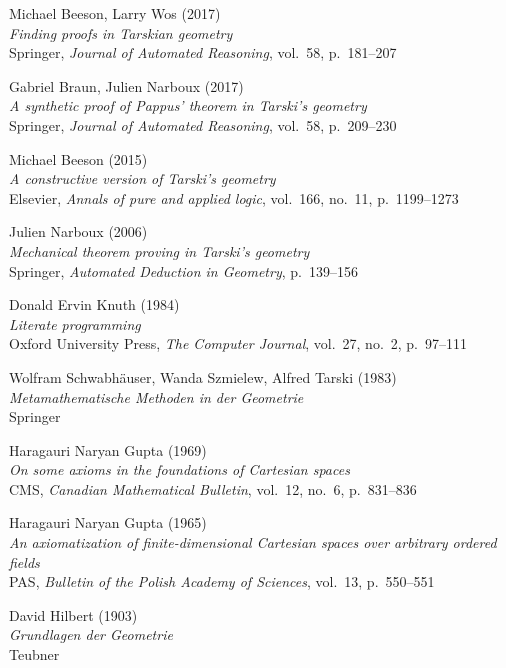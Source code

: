 \documentclass[10pt,a4paper,parskip=half,numbers=endperiod,parskip]{scrartcl}
\theoremstyle{formalized}
\begin{document}
  Michael Beeson, Larry Wos (2017)
  \\ \textit{Finding proofs in Tarskian geometry}
  \\ Springer, \textit{Journal of Automated Reasoning}, vol.~58, p.~181--207

  Gabriel Braun, Julien Narboux (2017)
  \\ \textit{A synthetic proof of Pappus' theorem in Tarski's geometry}
  \\ Springer, \textit{Journal of Automated Reasoning}, vol.~58, p.~209--230

  Michael Beeson (2015)
  \\ \textit{A constructive version of Tarski's geometry}
  \\ Elsevier, \textit{Annals of pure and applied logic}, vol.~166, no.~11, p.~1199--1273

  Julien Narboux (2006)
  \\ \textit{Mechanical theorem proving in Tarski's geometry}
  \\ Springer, \textit{Automated Deduction in Geometry}, p.~139--156

  Donald Ervin Knuth (1984)
  \\ \textit{Literate programming}
  \\ Oxford University Press, \textit{The Computer Journal}, vol.~27, no.~2, p.~97--111

  Wolfram Schwabhäuser, Wanda Szmielew, Alfred Tarski (1983)
  \\ \textit{Metamathematische Methoden in der Geometrie}
  \\ Springer

  Haragauri Naryan Gupta (1969)
  \\ \textit{On some axioms in the foundations of Cartesian spaces}
  \\ CMS,
  \textit{Canadian Mathematical Bulletin}, vol.~12, no.~6, p.~831--836

  Haragauri Naryan Gupta (1965)
  \\ \textit{An axiomatization of finite-dimensional Cartesian spaces over arbitrary ordered fields}
  \\ PAS,
  \textit{Bulletin of the Polish Academy of Sciences}, vol.~13, p.~550--551

  David Hilbert (1903)
  \\ \textit{Grundlagen der Geometrie}
  \\ Teubner
\end{document}
